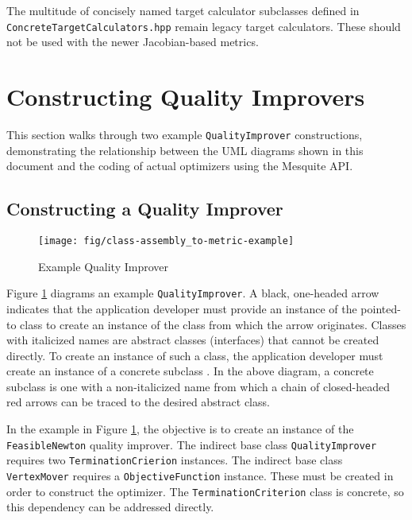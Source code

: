 \documentclass{article}
\begin{document}
The multitude of concisely named target calculator subclasses defined in \texttt{ConcreteTargetCalculators.hpp} remain legacy target calculators.  These should not be used with the newer Jacobian-based metrics.

\section{Constructing Quality Improvers}

This section walks through two example \texttt{QualityImprover} constructions, demonstrating the relationship between the UML diagrams shown in this document and the coding of actual optimizers using the Mesquite API.

\subsection{Constructing a Quality Improver}
\label{sec:ex1}

\begin{figure}[htb]
\begin{center}
\texttt{[image: fig/class-assembly\_to-metric-example]}
\caption{Example Quality Improver\label{fig:qiexample}}
\end{center}
\end{figure}

Figure \ref{fig:qiexample} diagrams an example \texttt{QualityImprover}.  A black, one-headed arrow indicates that the application developer must provide an instance of the pointed-to class to create an instance of the class from which the arrow originates.  Classes with italicized names are abstract classes (interfaces) that cannot be created directly.  To create an instance of such a class, the application developer must create an instance of a concrete subclass .  In the above diagram, a concrete subclass is one with a non-italicized name from which a chain of closed-headed red arrows can be traced to the desired abstract class.

In the example in Figure \ref{fig:qiexample}, the objective is to create an instance of the \texttt{FeasibleNewton} quality improver.  The indirect base class \texttt{QualityImprover} requires two \texttt{TerminationCrierion} instances.   The indirect base class \texttt{VertexMover} requires a \texttt{ObjectiveFunction} instance. These must be created in order to construct the optimizer.  The \texttt{TerminationCriterion} class is concrete, so this dependency can be addressed directly.  
\end{document}
